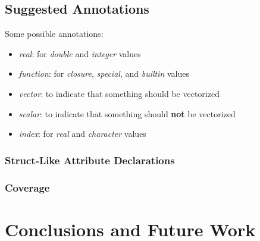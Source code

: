 \documentclass[acmsmall,10pt,review,anonymous]{acmart}\settopmatter{printfolios=true,printccs=false,printacmref=false}
\begin{document}
%
%
%
%
\subsection{Suggested Annotations}


Some possible annotations:

\begin{itemize}
    \item \textit{real}: for \textit{double} and \textit{integer} values
    \item \textit{function}: for \textit{closure}, \textit{special}, and \textit{builtin} values
    \item \textit{vector}: to indicate that something should be vectorized
    \item \textit{scalar}: to indicate that something should \textbf{not} be vectorized
    \item \textit{index}: for \textit{real} and \textit{character} values
\end{itemize}

%
%
\subsubsection{Struct-Like Attribute Declarations}


%
%
\subsubsection{Coverage}


\section{Conclusions and Future Work}



\end{document}
